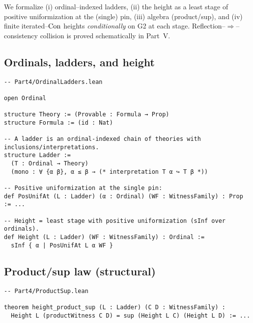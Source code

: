\documentclass[11pt]{article}
\theoremstyle{definition}
\theoremstyle{remark}
\begin{document}
We formalize (i) ordinal–indexed ladders, (ii) the height as a least stage of positive uniformization at the (single) pin, (iii) algebra (product/sup), and (iv) finite iterated--$\mathrm{Con}$ heights \emph{conditionally} on G2 at each stage. Reflection–$\Rightarrow$–consistency collision is proved schematically in Part~V.

\subsection*{Ordinals, ladders, and height}
\begin{verbatim}
-- Part4/OrdinalLadders.lean

open Ordinal

structure Theory := (Provable : Formula → Prop)
structure Formula := (id : Nat)

-- A ladder is an ordinal-indexed chain of theories with inclusions/interpretations.
structure Ladder :=
  (T : Ordinal → Theory)
  (mono : ∀ {α β}, α ≤ β → (* interpretation T α ↪ T β *))

-- Positive uniformization at the single pin:
def PosUnifAt (L : Ladder) (α : Ordinal) (WF : WitnessFamily) : Prop := ...

-- Height = least stage with positive uniformization (sInf over ordinals).
def Height (L : Ladder) (WF : WitnessFamily) : Ordinal :=
  sInf { α | PosUnifAt L α WF }
\end{verbatim}

\subsection*{Product/sup law (structural)}
\begin{verbatim}
-- Part4/ProductSup.lean

theorem height_product_sup (L : Ladder) (C D : WitnessFamily) :
  Height L (productWitness C D) = sup (Height L C) (Height L D) := ...
\end{verbatim}
\end{document}
